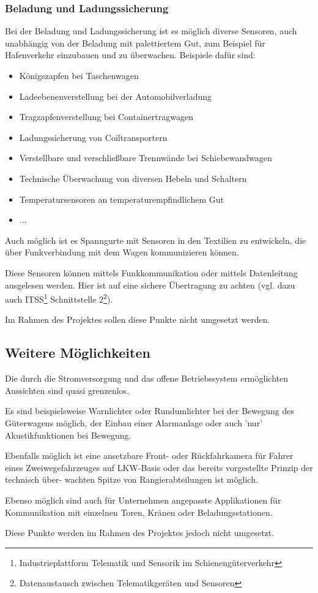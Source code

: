 \subsubsection{Beladung und Ladungssicherung}
Bei der Beladung und Ladungssicherung ist es möglich diverse Sensoren, auch unabhängig von der Beladung mit palettiertem Gut, zum Beispiel für Hafenverkehr einzubauen und zu überwachen. Beispiele dafür sind:
\begin{itemize}
    \item Königszapfen bei Taschenwagen
    \item Ladeebenenverstellung bei der Automobilverladung
    \item Tragzapfenverstellung bei Containertragwagen
    \item Ladungssicherung von Coiltransportern
    \item Verstellbare und verschließbare Trennwände bei Schiebewandwagen
    \item Technische Überwachung von diversen Hebeln und Schaltern
    \item Temperatursensoren an temperaturempfindlichem Gut
    \item ...
\end{itemize}
Auch möglich ist es Spanngurte mit Sensoren in den Textilien zu entwickeln, die über Funkverbindung mit dem Wagen kommunizieren können.\par
Diese Sensoren können mittels Funkkommunikation oder mittels Datenleitung ausgelesen werden. Hier ist auf eine sichere Übertragung zu achten (vgl. dazu auch ITSS\footnote{Industrieplattform Telematik und Sensorik im Schienengüterverkehr} Schnittstelle 2\footnote{Datenaustausch zwischen Telematikgeräten und Sensoren}).\par
Im Rahmen des Projektes sollen diese Punkte nicht umgesetzt werden.

\subsection{Weitere Möglichkeiten}
Die durch die Stromversorgung und das offene Betriebssystem ermöglichten Aussichten sind quasi grenzenlos.\par
Es sind beispielsweise Warnlichter oder Rundumlichter bei der Bewegung des Güterwagens möglich, der Einbau einer Alarmanlage oder auch 'nur' Akustikfunktionen bei Bewegung.\par
Ebenfalls möglich ist eine ansetzbare Front- oder Rückfahrkamera für Fahrer eines \gls{Zweiwegefahrzeug}es auf LKW-Basis oder das bereits vorgestellte Prinzip der technisch über- wachten Spitze von Rangierabteilungen\cite{RTUS} ist möglich.\par
Ebenso möglich sind auch für Unternehmen angepasste Applikationen für Kommunikation mit einzelnen Toren, Kränen oder Beladungsstationen.\par
Diese Punkte werden im Rahmen des Projektes jedoch nicht umgesetzt.
